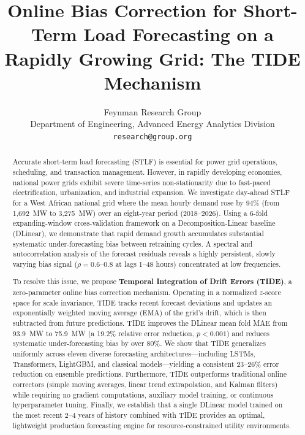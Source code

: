\documentclass[10pt,twocolumn,letterpaper]{article}
\title{\Large\bf Online Bias Correction for Short-Term Load Forecasting on a Rapidly Growing Grid: The TIDE Mechanism}
\author{Feynman Research Group \\ Department of Engineering, Advanced Energy Analytics Division \\ {\tt\small research@group.org}}
\date{}
\begin{document}
\maketitle

\begin{abstract}
Accurate short-term load forecasting (STLF) is essential for power grid operations, scheduling, and transaction management. However, in rapidly developing economies, national power grids exhibit severe time-series non-stationarity due to fast-paced electrification, urbanization, and industrial expansion. We investigate day-ahead STLF for a West African national grid where the mean hourly demand rose by 94\% (from 1,692~MW to 3,275~MW) over an eight-year period (2018--2026). Using a 6-fold expanding-window cross-validation framework on a Decomposition-Linear baseline (DLinear), we demonstrate that rapid demand growth accumulates substantial systematic under-forecasting bias between retraining cycles. A spectral and autocorrelation analysis of the forecast residuals reveals a highly persistent, slowly varying bias signal ($\rho = 0.6$--$0.8$ at lags 1--48 hours) concentrated at low frequencies.

To resolve this issue, we propose \textbf{Temporal Integration of Drift Errors (TIDE)}, a zero-parameter online bias correction mechanism. Operating in a normalized $z$-score space for scale invariance, TIDE tracks recent forecast deviations and updates an exponentially weighted moving average (EMA) of the grid's drift, which is then subtracted from future predictions. TIDE improves the DLinear mean fold MAE from 93.9~MW to 75.9~MW (a 19.2\% relative error reduction, $p < 0.001$) and reduces systematic under-forecasting bias by over 80\%. We show that TIDE generalizes uniformly across eleven diverse forecasting architectures---including LSTMs, Transformers, LightGBM, and classical models---yielding a consistent 23--26\% error reduction on ensemble predictions. Furthermore, TIDE outperforms traditional online correctors (simple moving averages, linear trend extrapolation, and Kalman filters) while requiring no gradient computations, auxiliary model training, or continuous hyperparameter tuning. Finally, we establish that a single DLinear model trained on the most recent 2--4 years of history combined with TIDE provides an optimal, lightweight production forecasting engine for resource-constrained utility environments.
\end{abstract}
\end{document}
